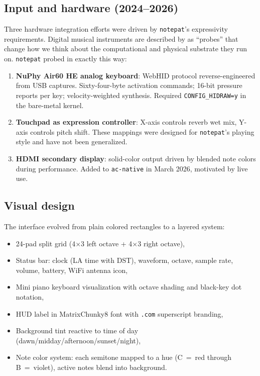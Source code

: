 \documentclass[10pt,letterpaper,twocolumn]{article}
\begin{document}
\subsection{Input and hardware (2024--2026)}

Three hardware integration efforts were driven by \texttt{notepat}'s expressivity requirements. Digital musical instruments are described by \citet{tahiroglu2020probes} as ``probes'' that change how we think about the computational and physical substrate they run on. \texttt{notepat} probed in exactly this way:

\begin{enumerate}
  \item \textbf{NuPhy Air60 HE analog keyboard}: WebHID protocol reverse-engineered from USB captures. Sixty-four-byte activation commands; 16-bit pressure reports per key; velocity-weighted synthesis. Required \texttt{CONFIG\_HIDRAW=y} in the bare-metal kernel.
  \item \textbf{Touchpad as expression controller}: X-axis controls reverb wet mix, Y-axis controls pitch shift. These mappings were designed for \texttt{notepat}'s playing style and have not been generalized.
  \item \textbf{HDMI secondary display}: solid-color output driven by blended note colors during performance. Added to \texttt{ac-native} in March 2026, motivated by live use.
\end{enumerate}

\subsection{Visual design}

The interface evolved from plain colored rectangles to a layered system:

\begin{itemize}
  \item 24-pad split grid (4$\times$3 left octave + 4$\times$3 right octave),
  \item Status bar: clock (LA time with DST), waveform, octave, sample rate, volume, battery, WiFi antenna icon,
  \item Mini piano keyboard visualization with octave shading and black-key dot notation,
  \item HUD label in MatrixChunky8 font with \texttt{.com} superscript branding,
  \item Background tint reactive to time of day (dawn/midday/afternoon/sunset/night),
  \item Note color system: each semitone mapped to a hue (C~=~red through B~=~violet), active notes blend into background.
\end{itemize}
\end{document}

